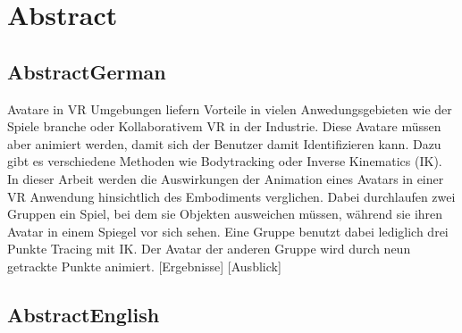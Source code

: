 \chapter*{Abstract}

\section*{AbstractGerman}
Avatare in VR Umgebungen liefern Vorteile in vielen Anwedungsgebieten wie der Spiele branche oder Kollaborativem VR in der Industrie. Diese Avatare müssen aber animiert werden, damit sich der Benutzer damit Identifizieren kann. Dazu gibt es verschiedene Methoden wie Bodytracking oder Inverse Kinematics (IK).
In dieser Arbeit werden die Auswirkungen der Animation eines Avatars in einer VR Anwendung hinsichtlich des Embodiments verglichen. Dabei durchlaufen zwei Gruppen ein Spiel, bei dem sie Objekten ausweichen müssen, während sie ihren Avatar in einem Spiegel vor sich sehen. Eine Gruppe benutzt dabei lediglich drei Punkte Tracing mit IK. Der Avatar der anderen Gruppe wird durch neun getrackte Punkte animiert. 
[Ergebnisse]
[Ausblick]


\section*{AbstractEnglish}
